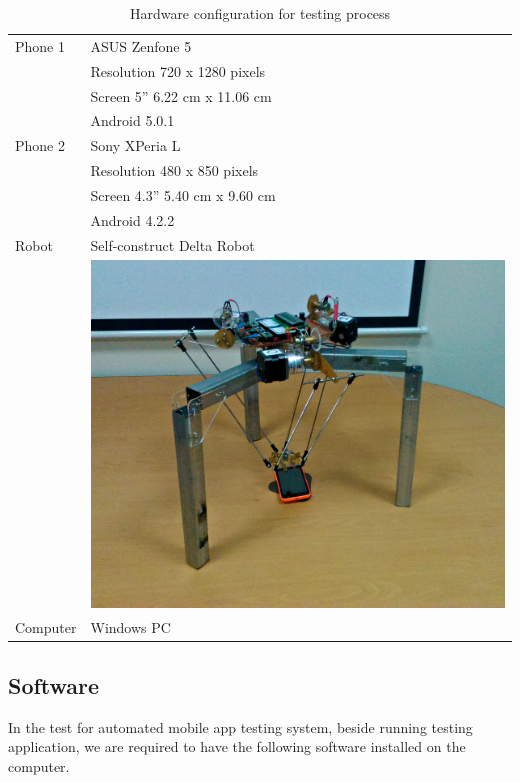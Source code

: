 \begin{table}[H]
	\centering
	\caption{Hardware configuration for testing process}	
	\label{tab:hw}
	\begin{tabularx}{0.65\textwidth}{ll}
		\toprule
		Phone 1 & ASUS Zenfone 5 \\
			  & Resolution 720 x 1280 pixels \\
			  & Screen 5'' 6.22 cm x 11.06 cm \\
			  & Android 5.0.1\\
		\midrule 
		Phone 2 & Sony XPeria L \\
			  & Resolution 480 x 850 pixels \\
			  & Screen 4.3'' 5.40 cm x 9.60 cm \\
			  & Android 4.2.2\\
		\midrule 
		Robot & Self-construct Delta Robot \\
			  & \begin{minipage}{0.5\linewidth}
				\includegraphics[width=0.8\linewidth]{Chapters/Fig/real_delta_robot.jpg}
				\end{minipage} \\
		\midrule 
		Computer & Windows PC \\
		\bottomrule
	\end{tabularx}
\end{table}

\subsection{Software}

In the test for automated mobile app testing system, beside running testing application, we are required to have the following software installed on the computer.

